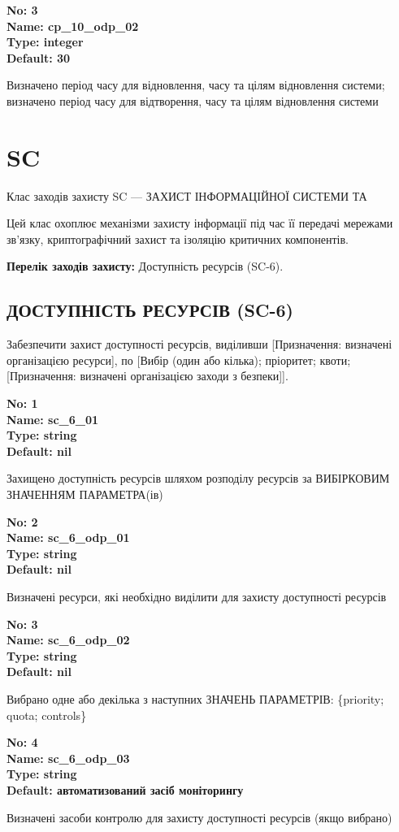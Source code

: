 \documentclass{article}
\begin{document}
{\footnotesize\bfseries
No: 3\\
Name: cp\_\allowbreak{}10\_\allowbreak{}odp\_\allowbreak{}02\\
Type: integer\\
Default: 30
}

{\footnotesize Визначено період часу для відновлення, часу та цілям відновлення системи; визначено період часу для відтворення, часу та цілям відновлення системи}




\section{SC}
Клас заходів захисту SC --- ЗАХИСТ ІНФОРМАЦІЙНОЇ СИСТЕМИ ТА

Цей клас охоплює механізми захисту інформації під час її передачі мережами зв'язку, криптографічний захист та ізоляцію критичних компонентів.

\textbf{Перелік заходів захисту:} Доступність ресурсів (SC-6).

\subsection{ДОСТУПНІСТЬ РЕСУРСІВ (SC-6)}
Забезпечити захист доступності ресурсів, виділивши [Призначення: визначені організацією ресурси], по [Вибір (один або кілька); пріоритет; квоти; [Призначення: визначені організацією заходи з безпеки]].

\vspace{10pt}
{\footnotesize\bfseries
No: 1\\
Name: sc\_\allowbreak{}6\_\allowbreak{}01\\
Type: string\\
Default: nil
}

{\footnotesize Захищено доступність ресурсів шляхом розподілу ресурсів за ВИБІРКОВИМ ЗНАЧЕННЯМ ПАРАМЕТРА(ів)}


{\footnotesize\bfseries
No: 2\\
Name: sc\_\allowbreak{}6\_\allowbreak{}odp\_\allowbreak{}01\\
Type: string\\
Default: nil
}

{\footnotesize Визначені ресурси, які необхідно виділити для захисту доступності ресурсів}


{\footnotesize\bfseries
No: 3\\
Name: sc\_\allowbreak{}6\_\allowbreak{}odp\_\allowbreak{}02\\
Type: string\\
Default: nil
}

{\footnotesize Вибрано одне або декілька з наступних ЗНАЧЕНЬ ПАРАМЕТРІВ: \{priority; quota; controls\}}


{\footnotesize\bfseries
No: 4\\
Name: sc\_\allowbreak{}6\_\allowbreak{}odp\_\allowbreak{}03\\
Type: string\\
Default: \textquotedbl{}автоматизований засіб моніторингу\textquotedbl{}
}

{\footnotesize Визначені засоби контролю для захисту доступності ресурсів (якщо вибрано)}
\end{document}
